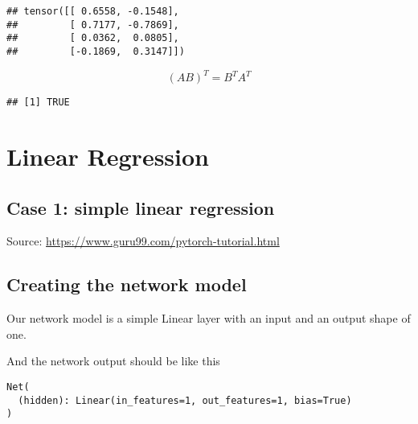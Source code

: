 \documentclass[]{book}
\newenvironment{Shaded}{\begin{snugshade}}{\end{snugshade}}
\newcommand{\DataTypeTok}[1]{\textcolor[rgb]{0.13,0.29,0.53}{#1}}
\newcommand{\DecValTok}[1]{\textcolor[rgb]{0.00,0.00,0.81}{#1}}
\newcommand{\FloatTok}[1]{\textcolor[rgb]{0.00,0.00,0.81}{#1}}
\newcommand{\KeywordTok}[1]{\textcolor[rgb]{0.13,0.29,0.53}{\textbf{#1}}}
\newcommand{\NormalTok}[1]{#1}
\newcommand{\OperatorTok}[1]{\textcolor[rgb]{0.81,0.36,0.00}{\textbf{#1}}}
\newcommand{\StringTok}[1]{\textcolor[rgb]{0.31,0.60,0.02}{#1}}
\begin{document}
\begin{verbatim}
## tensor([[ 0.6558, -0.1548],
##         [ 0.7177, -0.7869],
##         [ 0.0362,  0.0805],
##         [-0.1869,  0.3147]])
\end{verbatim}

\[(A B)^T = B^T A^T\]

\begin{Shaded}
\end{Shaded}

\begin{verbatim}
## [1] TRUE
\end{verbatim}

\hypertarget{linear-regression}{%
\chapter{Linear Regression}\label{linear-regression}}

\hypertarget{case-1-simple-linear-regression}{%
\section{Case 1: simple linear regression}\label{case-1-simple-linear-regression}}

Source: \url{https://www.guru99.com/pytorch-tutorial.html}

\hypertarget{creating-the-network-model}{%
\section{Creating the network model}\label{creating-the-network-model}}

Our network model is a simple Linear layer with an input and an output shape of one.

And the network output should be like this

\begin{verbatim}
Net(
  (hidden): Linear(in_features=1, out_features=1, bias=True)
)
\end{verbatim}

\begin{Shaded}
\end{Shaded}
\end{document}
